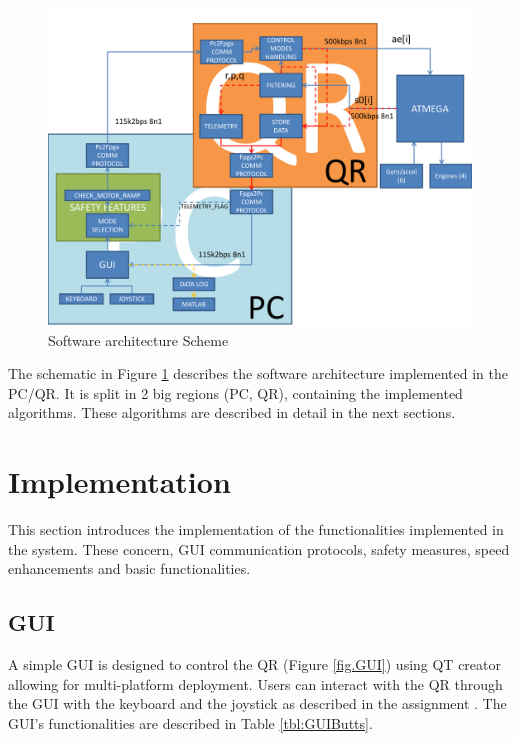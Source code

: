 \documentclass{article}
\begin{document}
\begin{figure}[h]
\centering
	\includegraphics[width=13cm]{Figures/Architecture.pdf}
	\caption{Software architecture Scheme}
	\label{fig.Architecture}
\end{figure}

The schematic in Figure \ref{fig.Architecture} describes the software architecture implemented in the PC/QR. It is split in 2 big regions (PC, QR), containing the implemented algorithms. These algorithms are described in detail in the next sections.



\section{Implementation}
\label{sec:implementation}

This section introduces the implementation of the functionalities implemented in the system. These concern, GUI communication protocols, safety measures, speed enhancements and basic functionalities.


\subsection{GUI}
A simple GUI is designed to control the QR (Figure \ref{fig.GUI}) using QT creator allowing for multi-platform deployment. Users can interact with the QR through the GUI with the keyboard and the joystick as described in the assignment \cite{langendoen2014assignment}. The GUI's functionalities are described in Table \ref{tbl:GUIButts}. 
\end{document}

